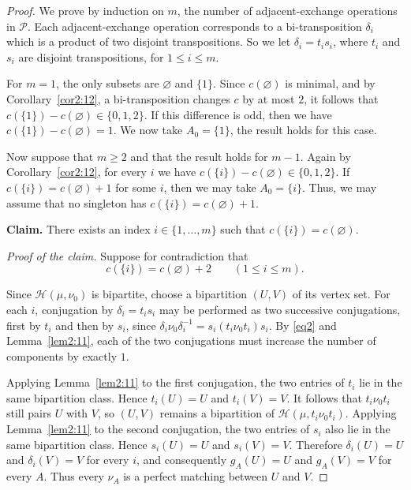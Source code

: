\documentclass[10pt,a4paper]{amsart}
\begin{document}
\begin{proof}
We prove by induction on $m$, the number of adjacent-exchange operations in $\mathcal P$.
Each adjacent-exchange operation corresponds to
a bi-transposition $\delta_i$ which is a product of two disjoint transpositions.
So we let $\delta_i=t_is_i$, where $t_i$ and $s_i$ are disjoint transpositions, for $1\leq i\leq m$.


For $m=1$, the only subsets are $\varnothing$ and $\{1\}$. Since $c(\varnothing)$ is minimal, and by Corollary~\ref{cor2:12}, a bi-transposition changes $c$ by at most $2$, it follows that $c(\{1\})-c(\varnothing)\in\{0,1,2\}$. If this difference is odd, then we have $c(\{1\})-c(\varnothing)=1$. We now take $A_0=\{1\}$, the result holds for this case.

Now suppose that $m\geq2$ and that the result holds for $m-1.$
Again by
Corollary~\ref{cor2:12}, for every $i$ we have
$c(\{i\})-c(\varnothing)\in\{0,1,2\}$.
If $c(\{i\})=c(\varnothing)+1$ for some $i$, then we may take
$A_0=\{i\}$. Thus, we may assume that no singleton has $c(\{i\})=c(\varnothing)+1$.

\medskip
\noindent\textbf{Claim.}
There exists an index $i\in\{1,\ldots,m\}$ such that
$c(\{i\})=c(\varnothing)$.

\smallskip
\noindent\textit{Proof of the claim.}
Suppose for contradiction that
\begin{equation}
c(\{i\})=c(\varnothing)+2
\qquad (1\leq i\leq m).
\label{eq2}
\end{equation}

Since $\mathcal H(\mu,\nu_0)$ is bipartite, choose a bipartition
$(U,V)$ of its vertex set. For each $i$, conjugation by
$\delta_i=t_is_i$ may be performed as two successive conjugations,
first by $t_i$ and then by $s_i$, since
$\delta_i\nu_0\delta_i^{-1}=s_i(t_i\nu_0t_i)s_i$.
By \eqref{eq2} and
Lemma~\ref{lem2:11}, each of the two conjugations must
increase the number of components by exactly $1$.

Applying Lemma~\ref{lem2:11} to the first
conjugation, the two entries of $t_i$ lie in the same bipartition
class. Hence $t_i(U)=U$ and $t_i(V)=V$. It follows that
$t_i\nu_0t_i$ still pairs $U$ with $V$, so $(U,V)$ remains a
bipartition of $\mathcal H(\mu,t_i\nu_0t_i)$.
Applying Lemma~\ref{lem2:11} to the second
conjugation, the two entries of $s_i$ also lie in the same
bipartition class. Hence $s_i(U)=U$ and $s_i(V)=V$.
Therefore $\delta_i(U)=U$ and $\delta_i(V)=V$ for every $i$, and
consequently $g_A(U)=U$ and $g_A(V)=V$ for every $A$.
Thus every $\nu_A$ is a perfect matching between $U$ and $V$.


\end{proof}
\end{document}
